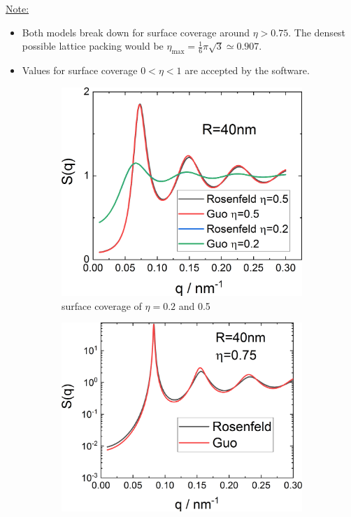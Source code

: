 \noindent\uline{Note:}
\begin{itemize}
\item Both models break down for surface coverage around $\eta>0.75$. The densest possible lattice packing would be $\eta_\mathrm{max}=\frac16\pi\sqrt{3}\simeq 0.907$.
\item Values for surface coverage $0 < \eta < 1$ are accepted by the software.
\end{itemize}

\begin{figure}[htb]
\begin{subfigure}[b]{.43\textwidth}
   \centering
   \includegraphics[width=1\textwidth]{../images/structure_factor/2D_hard_disk_fluid/HardDisks_low.png}
   \caption{surface coverage of $\eta=0.2$ and 0.5}
   \label{fig:RosenfeldGuo1}
\end{subfigure}
\hfill
\begin{subfigure}[b]{.47\textwidth}
   \centering
   \includegraphics[width=1\textwidth]{../images/structure_factor/2D_hard_disk_fluid/HardDisks_high.png}

\end{subfigure}
\end{figure}
